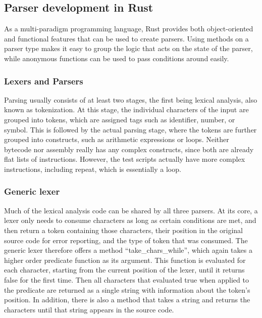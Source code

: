 \subsection{Parser development in Rust} \label{parser-dev}
As a multi-paradigm programming language, Rust provides both object-oriented and functional features that can be used to create parsers.
Using methods on a parser type makes it easy to group the logic that acts on the state of the parser, while anonymous functions can be used to pass conditions around easily.

\subsubsection{Lexers and Parsers}
Parsing usually consists of at least two stages, the first being lexical analysis, also known as tokenization.
At this stage, the individual characters of the input are grouped into tokens, which are assigned tags such as identifier, number, or symbol.
This is followed by the actual parsing stage, where the tokens are further grouped into constructs, such as arithmetic expressions or loops.
Neither bytecode nor assembly really has any complex constructs, since both are already flat lists of instructions.
However, the test scripts actually have more complex instructions, including repeat, which is essentially a loop.

\subsubsection{Generic lexer}
Much of the lexical analysis code can be shared by all three parsers. At its core, a lexer only needs to consume characters as long as certain conditions are met, and then return a token containing those characters, their position in the original source code for error reporting, and the type of token that was consumed.
The generic lexer therefore offers a method ``take\_chars\_while'', which again takes a higher order predicate function as its argument. This function is evaluated for each character, starting from the current position of the lexer, until it returns false for the first time. Then all characters that evaluated true when applied to the predicate are returned as a single string with information about the token's position.
In addition, there is also a method that takes a string and returns the characters until that string appears in the source code.

